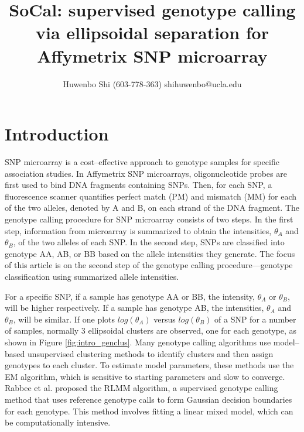 \documentclass{scrartcl}
\begin{document}

\newcommand*{\TitleFont}{%
      \usefont{\encodingdefault}{\rmdefault}{b}{n}%
      \fontsize{16}{20}%
      \selectfont}
\newcommand*{\AuthorFont}{%
      \usefont{\encodingdefault}{\rmdefault}{r}{n}%
      \fontsize{12}{20}%
      \selectfont}
\title{\TitleFont SoCal: supervised genotype calling via ellipsoidal
separation for Affymetrix SNP microarray}
\author{\AuthorFont Huwenbo Shi (603-778-363) shihuwenbo@ucla.edu}
\date{}
\maketitle


\section{Introduction}

\par
SNP microarray is a cost--effective approach to genotype samples for specific
association studies. %
In Affymetrix SNP microarrays, oligonucleotide probes are first used to bind
DNA fragments containing SNPs. %
Then, for each SNP, a fluorescence scanner quantifies perfect match (PM) and
mismatch (MM) for each of the two alleles, denoted by A and B, on
each strand of the DNA fragment. %
The genotype calling procedure for SNP microarray consists of two steps.
In the first step, information from microarray is summarized to obtain the
intensities, $\theta_A$ and $\theta_B$, of the two alleles of each SNP.
In the second step, SNPs are classified into genotype AA, AB, or BB based on
the allele intensities they generate.
The focus of this article is on the second step of the genotype calling
procedure---genotype classification using summarized allele intensities.

\par
For a specific SNP, if a sample has genotype AA or BB, the intensity,
$\theta_A$ or $\theta_B$, will be higher respectively. 
If a sample has genotype AB, the intensities, $\theta_A$ and $\theta_B$,
will be similar.
If one plots $log(\theta_A)$ versus $log(\theta_B)$ of a SNP for a number of
samples, normally 3 ellipsoidal clusters are observed, one for each genotype,
as shown in Figure \ref{fig:intro_genclus}.
Many genotype calling algorithms use model--based unsupervised clustering
methods to identify clusters and then assign genotypes to each cluster.
To estimate model parameters, these methods use the EM algorithm, which is
sensitive to starting parameters and slow to converge.
Rabbee et al. proposed the RLMM algorithm, a supervised genotype calling
method that uses reference genotype calls to form Gaussian decision
boundaries for each genotype.
This method involves fitting a linear mixed model, which can be computationally
intensive.
\end{document}
